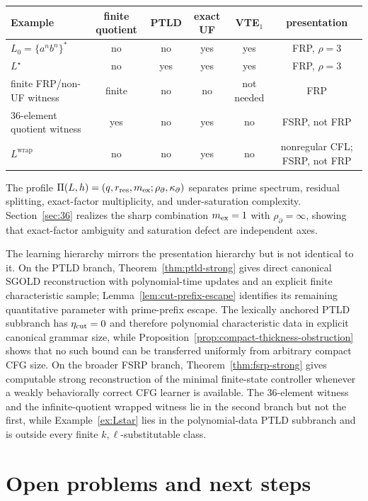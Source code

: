 \documentclass[11pt,a4paper]{article}
\begin{document}
\begin{center}
\scriptsize
\begin{tabular}{lccccc}
\toprule
Example & finite quotient & PTLD & exact UF & VTE$_1$ & presentation\\
\midrule
$L_0=\{a^nb^n\}^*$ & no & no & yes & yes & FRP, $\rho=3$\\
$L^\star$ & no & yes & yes & yes & FRP, $\rho=3$\\
finite FRP/non-UF witness & finite & no & no & not needed & FRP\\
$36$-element quotient witness & yes & no & yes & no & FSRP, not FRP\\
$L^{\mathrm{wrap}}$ & no & no & yes & no & nonregular CFL; FSRP, not FRP\\
\bottomrule
\end{tabular}
\end{center}

The profile $\Pi(L,h)=(q,r_{\rm res},m_{\rm ex};\rho_\partial,\kappa_\partial)$ separates prime spectrum, residual splitting, exact-factor multiplicity, and under-saturation complexity.  Section~\ref{sec:36} realizes the sharp combination $m_{\rm ex}=1$ with $\rho_\partial=\infty$, showing that exact-factor ambiguity and saturation defect are independent axes.

The learning hierarchy mirrors the presentation hierarchy but is not identical to it.  On the PTLD branch, Theorem~\ref{thm:ptld-strong} gives direct canonical SGOLD reconstruction with polynomial-time updates and an explicit finite characteristic sample; Lemma~\ref{lem:cut-prefix-escape} identifies its remaining quantitative parameter with prime-prefix escape.  The lexically anchored PTLD subbranch has $\eta_{\rm cut}=0$ and therefore polynomial characteristic data in explicit canonical grammar size, while Proposition~\ref{prop:compact-thickness-obstruction} shows that no such bound can be transferred uniformly from arbitrary compact CFG size.  On the broader FSRP branch, Theorem~\ref{thm:fsrp-strong} gives computable strong reconstruction of the minimal finite-state controller whenever a weakly behaviorally correct CFG learner is available.  The $36$-element witness and the infinite-quotient wrapped witness lie in the second branch but not the first, while Example~\ref{ex:Lstar} lies in the polynomial-data PTLD subbranch and is outside every finite $k,\ell$-substitutable class.

\section{Open problems and next steps}
\end{document}
